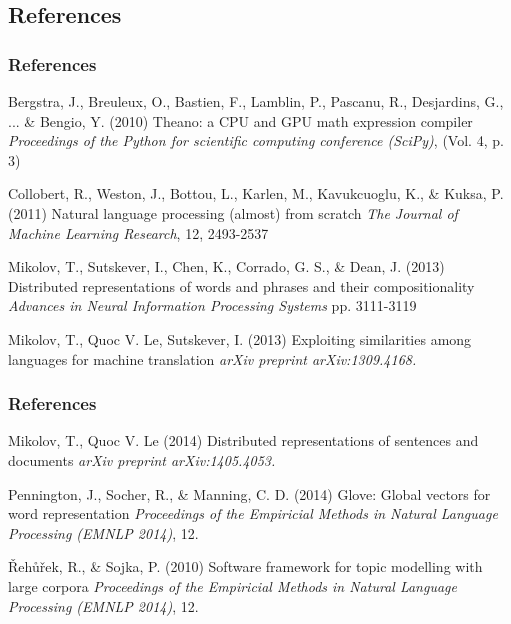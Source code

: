 \documentclass{beamer}
\begin{document}
\begin{frame}
\section{References}

\frametitle{References}
\footnotesize{
\begin{thebibliography}{99}


 Bergstra, J., Breuleux, O., Bastien, F., Lamblin, P., Pascanu, R., Desjardins, G., ... \& Bengio, Y. (2010)
\newblock Theano: a CPU and GPU math expression compiler
\newblock \emph{Proceedings of the Python for scientific computing conference (SciPy)}, (Vol. 4, p. 3) 




 Collobert, R., Weston, J., Bottou, L., Karlen, M., Kavukcuoglu, K., \& Kuksa, P. (2011)
\newblock Natural language processing (almost) from scratch
\newblock \emph{The Journal of Machine Learning Research}, 12, 2493-2537 


 Mikolov, T., Sutskever, I., Chen, K., Corrado, G. S., \& Dean, J. (2013)
\newblock Distributed representations of words and phrases and their compositionality
\newblock \emph{Advances in Neural Information Processing Systems} pp. 3111-3119

 Mikolov, T., Quoc V. Le, Sutskever, I. (2013)
\newblock Exploiting similarities among languages for machine translation
\newblock \emph{arXiv preprint arXiv:1309.4168.} 



\end{thebibliography}
}
\end{frame}

\begin{frame}
\frametitle{References}
\footnotesize{
\begin{thebibliography}{99}

 Mikolov, T., Quoc V. Le (2014)
\newblock Distributed representations of sentences and documents
\newblock \emph{arXiv preprint arXiv:1405.4053.} 


 Pennington, J., Socher, R., \& Manning, C. D. (2014)
\newblock Glove: Global vectors for word representation
\newblock \emph{Proceedings of the Empiricial Methods in Natural Language Processing (EMNLP 2014)}, 12.


 {\v R}eh{\r u}{\v r}ek, R., \& Sojka, P. (2010)
\newblock Software framework for topic modelling with large corpora
\newblock \emph{Proceedings of the Empiricial Methods in Natural Language Processing (EMNLP 2014)}, 12.


\end{thebibliography}
}
\end{frame}


\end{document}
